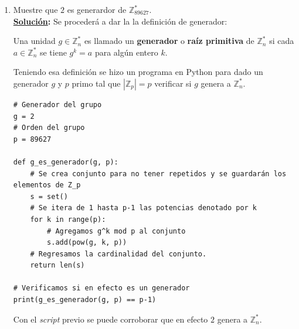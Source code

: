 \documentclass[11pt,letterpaper]{article}
\newcommand{\Z}{\mathbb{Z}}
\newcommand{\sol}{\textbf{\underline{Solución}: }} %
\begin{document}
\begin{enumerate}[label=\alph*)]
\item Muestre que $2$ es generardor de $\Z^*_{89627}$.\\
\sol Se procederá a dar la la definición de generador:
\begin{definition}
Una unidad $g \in \Z_{n}^{*}$ es llamado un \textbf{generador} o \textbf{raíz primitiva} de
$\Z_{n}^{*}$ si cada $a \in \Z_{n}^{*}$ se tiene $g^k = a$ para algún entero $k$.
\end{definition}
Teniendo esa definición se hizo un programa en Python para dado un generador $g$ y $p$ primo 
tal que $|\Z_p| = p$ verificar si $g$ genera a $\Z_{n}^{*}$.

\begin{verbatim}
# Generador del grupo
g = 2
# Orden del grupo
p = 89627

def g_es_generador(g, p):
    # Se crea conjunto para no tener repetidos y se guardarán los elementos de Z_p
    s = set()
    # Se itera de 1 hasta p-1 las potencias denotado por k
    for k in range(p):
        # Agregamos g^k mod p al conjunto
        s.add(pow(g, k, p))
    # Regresamos la cardinalidad del conjunto.
    return len(s)

# Verificamos si en efecto es un generador
print(g_es_generador(g, p) == p-1)
\end{verbatim}

Con el \textit{script} previo se puede corroborar que en efecto $2$ genera a $\Z_{n}^{*}$.


\end{enumerate}
\end{document}
